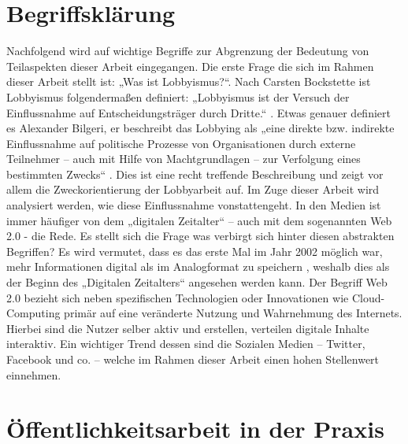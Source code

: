 \documentclass[12pt,a4paper,bibliography=totocnumbered,listof=totocnumbered]{scrartcl}
\begin{document}
\section{Begriffsklärung}

Nachfolgend wird auf wichtige Begriffe zur Abgrenzung der Bedeutung von Teilaspekten dieser Arbeit eingegangen.
Die erste Frage die sich im Rahmen dieser Arbeit stellt ist: „Was ist Lobbyismus?“. 
Nach Carsten Bockstette ist Lobbyismus folgendermaßen definiert: „Lobbyismus ist der Versuch der Einflussnahme auf Entscheidungsträger durch Dritte.“ \cite[vgl. S.18]{KNEV03}. Etwas genauer definiert es Alexander Bilgeri, er beschreibt das Lobbying als „eine direkte bzw. indirekte Einflussnahme auf politische Prozesse von Organisationen durch externe Teilnehmer – auch mit Hilfe von Machtgrundlagen – zur Verfolgung eines bestimmten Zwecks“ \cite[S.13]{DPL01}.  Dies ist eine recht treffende Beschreibung und zeigt vor allem die Zweckorientierung der Lobbyarbeit auf.
Im Zuge dieser Arbeit wird analysiert werden, wie diese Einflussnahme vonstattengeht.
In den Medien ist immer häufiger von dem „digitalen Zeitalter“ – auch mit dem sogenannten Web 2.0 - die Rede. Es stellt sich die Frage was verbirgt sich hinter diesen abstrakten Begriffen?
Es wird vermutet, dass es das erste Mal im Jahr 2002 möglich war, mehr Informationen digital als im Analogformat zu speichern \cite[vgl .S.60–65]{WTC11} , weshalb dies als der Beginn des „Digitalen Zeitalters“ angesehen werden kann.  Der Begriff Web 2.0 bezieht sich neben spezifischen Technologien oder Innovationen wie Cloud-Computing primär auf eine veränderte Nutzung und Wahrnehmung des Internets. \cite[vgl.]{EIWP} 
Hierbei sind die Nutzer selber aktiv und erstellen, verteilen digitale Inhalte interaktiv. Ein wichtiger Trend dessen sind die Sozialen Medien – Twitter, Facebook und co. – welche im Rahmen dieser Arbeit einen hohen Stellenwert einnehmen. 

\pagebreak

\section{Öffentlichkeitsarbeit in der Praxis}
\end{document}
